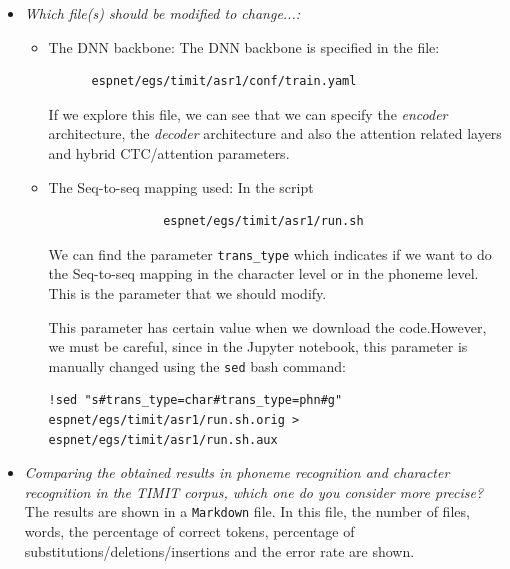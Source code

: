 \documentclass[a4paper]{article}
\def\inline{\lstinline[basicstyle=\ttfamily,keywordstyle={}]}
\begin{document}
\begin{itemize}
  \item \emph{Which file(s) should be modified to change...:}
        \begin{itemize}
          \item The DNN backbone: The DNN backbone is specified in the file:
                \begin{verbatim}
      espnet/egs/timit/asr1/conf/train.yaml
    \end{verbatim}
                If we explore this file, we can see that we can specify the \emph{encoder} architecture, the \emph{decoder} architecture and also the attention related layers and hybrid CTC/attention parameters.
          \item The Seq-to-seq mapping used: In the script
                \begin{verbatim}
                espnet/egs/timit/asr1/run.sh
\end{verbatim}
                We can find the parameter \inline{trans_type} which indicates if we want to do the Seq-to-seq mapping in the character level or in the phoneme level. This is the parameter that we should modify.

                This parameter has certain value when we download the code.However, we must be careful, since in the Jupyter notebook, this parameter is manually changed using the \inline{sed} bash command:
                \begin{verbatim}
!sed "s#trans_type=char#trans_type=phn#g" espnet/egs/timit/asr1/run.sh.orig > espnet/egs/timit/asr1/run.sh.aux
                \end{verbatim}
        \end{itemize}

  \item \emph{Comparing the obtained results in phoneme recognition and character recognition in the TIMIT corpus, which one do you consider more precise?}\\

        The results are shown in a \inline{Markdown} file. In this file, the number of files, words, the percentage of correct tokens, percentage of substitutions/deletions/insertions and the error rate are shown.


\end{itemize}
\end{document}

